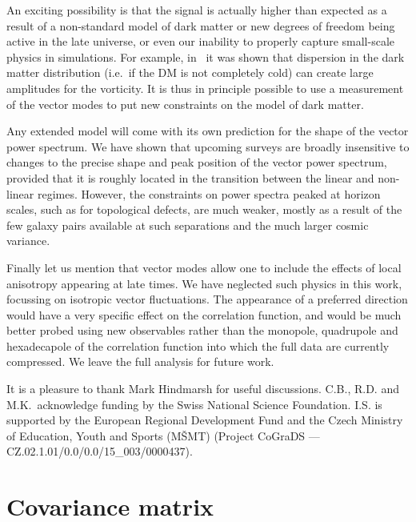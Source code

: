 \documentclass[a4paper,twocolumn,aps,prd,nolongbibliography,superscriptaddress,showpacs,showkeys,amsmath,amssymb,floatfix,nofootinbib]{revtex4-1}
\renewcommand{\[}{\begin{equation}}
\renewcommand{\]}{\end{equation}}
\begin{document}
An exciting possibility is that the signal is actually higher than expected as a result of a non-standard model of dark matter or new degrees of freedom being active in the late universe, or even our inability to properly capture small-scale physics in simulations. For example, in~\cite{Cusin:2016zvu} it was shown that dispersion in the dark matter distribution (i.e.\ if the DM is not completely cold) can create large amplitudes for the vorticity. It is thus in principle possible to use a measurement of the vector modes to put new constraints on the model of dark matter.

Any extended model will come with its own prediction for the shape of the vector power spectrum. We have shown that upcoming surveys are broadly insensitive to  changes to the precise shape and peak position of the vector power spectrum, provided that it is roughly located in the transition between the linear and non-linear regimes. However, the constraints on power spectra peaked at horizon scales, such as for topological defects, are much weaker, mostly as a result of the few galaxy pairs available at such separations and the much larger cosmic variance.

Finally let us mention that vector modes allow one to include the effects of local anisotropy appearing at late times. We have neglected such physics in this work, focussing on isotropic vector fluctuations. The appearance of a preferred direction would have a very specific effect on the correlation function, and would be much better probed using new observables rather than the monopole, quadrupole and hexadecapole of the correlation function into which the full data are currently compressed. We leave the full analysis for future work.




\begin{acknowledgments}
It is a pleasure to thank Mark Hindmarsh for useful discussions.
C.B., R.D. and M.K.~acknowledge
funding by the Swiss National Science Foundation. I.S. is supported by the European
Regional Development Fund and the Czech Ministry of Education, Youth
and Sports (MŠMT) (Project CoGraDS — CZ.02.1.01/0.0/0.0/15\_003/0000437). \end{acknowledgments}

\appendix

\section{Covariance matrix}
\label{sec:covariance}
\end{document}
